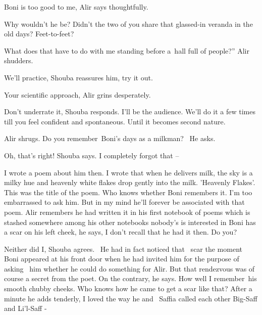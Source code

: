 \documentclass[12pt]{book}
\begin{document}
{\textquotedbl}Boni is too good to me,{\textquotedbl} Alir says thoughtfully.

{\textquotedbl}Why wouldn't he be? Didn't the two of you share that glassed-in veranda in the old days?
Feet-to-feet?{\textquotedbl}

{\textquotedbl}What does that have to do with me standing before a~hall full of people?'' Alir shudders.

{\textquotedbl}We'll practice,{\textquotedbl} Shouba reassures him, {\textquotedbl}try it out.{\textquotedbl}

{\textquotedbl}Your scientific approach,{\textquotedbl} Alir grins desperately.

{\textquotedbl}Don't underrate it,{\textquotedbl} Shouba responds. {\textquotedbl}I'll be the audience. We'll do it a
few times till you feel confident and spontaneous. Until it becomes second nature.{\textquotedbl}

Alir shrugs. {\textquotedbl}Do you remember~Boni's days as a milkman?{\textquotedbl} \ He asks.

{\textquotedbl}Oh, that's right!{\textquotedbl} Shouba says. {\textquotedbl}I completely forgot that --{\textquotedbl}

{\textquotedbl}I wrote a poem about him then. I wrote that when he delivers milk, the sky is a milky hue and heavenly
white flakes drop gently into the milk. 'Heavenly Flakes'. This was the title of the poem. Who knows whether Boni
remembers it. I'm too embarrassed to ask him. But in my mind he'll forever be associated with that poem.{\textquotedbl}
Alir remembers he had written it in his first notebook of poems which is stashed somewhere among his other notebooks
nobody's is interested in {\textquotedbl}Boni has a scar on his left cheek,{\textquotedbl} he says, {\textquotedbl}I
don't recall that he had it then. Do you?{\textquotedbl} \

{\textquotedbl}Neither did I,{\textquotedbl} Shouba agrees. \ He had in fact noticed that \ scar the moment Boni
appeared at his front door when he had invited him for the purpose of asking \ him whether he could do something for
Alir. But that rendezvous was of course a secret from the poet. {\textquotedbl}On the contrary,{\textquotedbl} he says.
{\textquotedbl}How well I remember~his smooth chubby cheeks. Who knows how he came to get a scar like
that?{\textquotedbl} After a minute he adds tenderly, {\textquotedbl}I loved the way he and~ Saffia called each other
Big-Saff and Li'l-Saff -{\textquotedbl}
\end{document}
